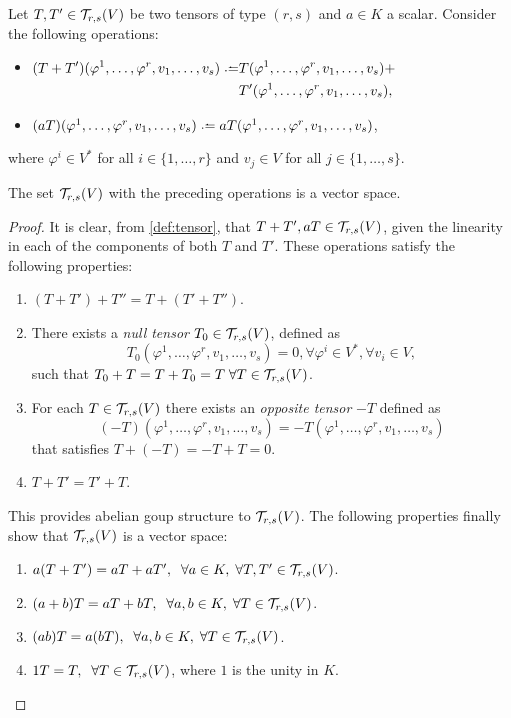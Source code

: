 \begin{theorem}
	Let $T, T' \in {\mathcal T}_{r,s}(V)$ be two tensors of type $(r,s)$ and $a \in K$ a scalar. Consider the following operations:
	\begin{itemize}
		\item $\begin{aligned}[t]
			(T+T') (\varphi^1, \dots, \varphi^r, v_1, \dots, v_s) \defeq &T(\varphi^1, \dots, \varphi^r, v_1, \dots, v_s) +\\
			&T'(\varphi^1, \dots, \varphi^r, v_1, \dots, v_s),
		\end{aligned}$
		\item $(a T)(\varphi^1, \dots, \varphi^r, v_1, \dots, v_s) \defeq a T(\varphi^1, \dots, \varphi^r, v_1, \dots, v_s)$,
	\end{itemize}
	where $\varphi^i \in V^*$ for all $i \in \{1,\dots,r\}$ and $v_j \in V$ for all $j \in \{1,\dots,s\}$.

	The set ${\mathcal T}_{r,s}(V)$ with the preceding operations is a vector space.
\end{theorem}

\begin{proof}
	It is clear, from \autoref{def:tensor}, that $T+T', aT \in {\mathcal T}_{r,s}(V)$, given the linearity in each of the components of both $T$ and $T'$.
	These operations satisfy the following properties:
	\begin{enumerate}
		\item $(T+T') + T'' = T + (T'+T'')$.
		\item There exists a \emph{null tensor} $T_0 \in {\mathcal T}_{r,s}(V)$, defined as \[T_0(\varphi^1, \dots, \varphi^r, v_1, \dots, v_s) = 0, \forall \varphi^i \in V^*, \forall v_i \in V,\] such that $T_0 + T = T + T_0 = T \;\forall T \in {\mathcal T}_{r,s}(V)$.
		\item For each $T\in{\mathcal T}_{r,s}(V)$ there exists an \emph{opposite tensor} $-T$ defined as \[(-T)(\varphi^1, \dots, \varphi^r, v_1, \dots, v_s) = - T(\varphi^1, \dots, \varphi^r, v_1, \dots, v_s)\] that satisfies $T + (-T) = -T + T = 0$.
		\item $T + T' = T' + T$.
	\end{enumerate}
	This provides abelian goup structure to ${\mathcal T}_{r,s}(V)$. The following properties finally show that ${\mathcal T}_{r,s}(V)$ is a vector space:
	\begin{enumerate}
		\item $a(T+T') = aT+ aT', \;\;\forall a \in K, \;\forall T,T' \in {\mathcal T}_{r,s}(V)$.
		\item $(a+b)T = aT + bT, \;\;\forall a,b \in K, \;\forall T \in {\mathcal T}_{r,s}(V)$.
		\item $(ab)T = a(bT), \;\;\forall a,b \in K, \;\forall T \in {\mathcal T}_{r,s}(V)$.
		\item $1T = T, \;\;\forall T \in {\mathcal T}_{r,s}(V)$, where $1$ is the unity in $K$.
	\end{enumerate}
\end{proof}

